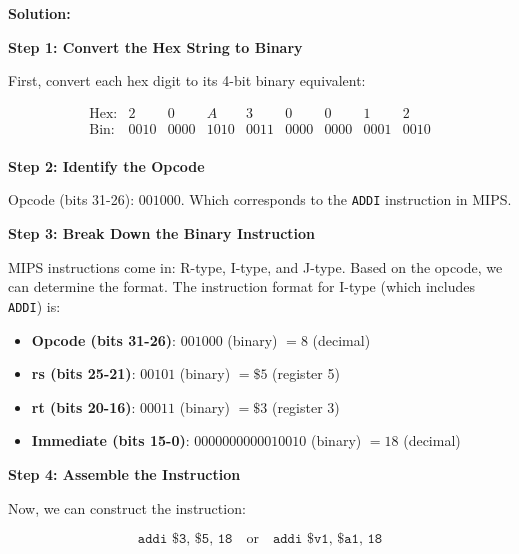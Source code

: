 \textbf{Solution:}

\textbf{Step 1: Convert the Hex String to Binary}

First, convert each hex digit to its 4-bit binary equivalent:

\[
\begin{array}{ccccccccc}
\text{Hex:} & 2 & 0 & A & 3 & 0 & 0 & 1 & 2 \\
\text{Bin:} & 0010 & 0000 & 1010 & 0011 & 0000 & 0000 & 0001 & 0010 \\
\end{array}
\]

\textbf{Step 2: Identify the Opcode}

Opcode (bits 31-26): \(001000\). Which corresponds to the \texttt{ADDI} instruction in MIPS.  \cite{MIPS32}

\textbf{Step 3: Break Down the Binary Instruction}

MIPS instructions come in: R-type, I-type, and J-type. Based on the opcode, we can determine the format. The instruction format for I-type (which includes \texttt{ADDI}) is:

\begin{itemize}
    \item \textbf{Opcode (bits 31-26)}: \(001000\) (binary) \(= 8\) (decimal)
    \item \textbf{rs (bits 25-21)}: \(00101\) (binary) \(= \$5\) (register 5)
    \item \textbf{rt (bits 20-16)}: \(00011\) (binary) \(= \$3\) (register 3)
    \item \textbf{Immediate (bits 15-0)}: \(0000000000010010\) (binary) \(= 18\) (decimal)
\end{itemize}



\textbf{Step 4: Assemble the Instruction}

Now, we can construct the instruction:

\[
\boxed{
\texttt{addi \$3, \$5, 18}
}
\quad \text{or} \quad
\boxed{
\texttt{addi \$v1, \$a1, 18}
}
\]

